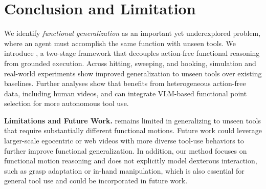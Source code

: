 \section{Conclusion and Limitation}
\label{sec:conclusion}
We identify \textit{functional generalization} as an important yet underexplored problem, where an agent must accomplish the same function with unseen tools.
We introduce \algoname{}, a two-stage framework that decouples action-free functional reasoning from grounded execution. Across hitting, sweeping, and hooking, simulation and real-world experiments show improved generalization to unseen tools over existing baselines. Further analyses show that \algoname{} benefits from heterogeneous action-free data, including human videos, and can integrate VLM-based functional point selection for more autonomous tool use.

\textbf{Limitations and Future Work.}
\algoname{} remains limited in generalizing to unseen tools that require substantially different functional motions. Future work could leverage larger-scale egocentric or web videos with more diverse tool-use behaviors to further improve functional generalization. In addition, our method focuses on functional motion reasoning and does not explicitly model dexterous interaction, such as grasp adaptation or in-hand manipulation, which is also essential for general tool use and could be incorporated in future work.